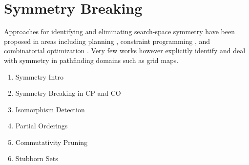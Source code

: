 \section{Symmetry Breaking}
\label{cha::lit::symmetry}
Approaches for identifying and eliminating search-space symmetry have been
proposed in areas including planning \cite{fox99}, constraint programming
\cite{gent00}, and combinatorial optimization \cite{fukunaga08}. 
Very few works however explicitly identify and deal with symmetry in pathfinding
domains such as grid maps. 

\begin{enumerate}
\item{Symmetry Intro}
\item{Symmetry Breaking in CP and CO}
\item{Isomorphism Detection}
\item{Partial Orderings}
\item{Commutativity Pruning}
\item{Stubborn Sets}
\end{enumerate}

